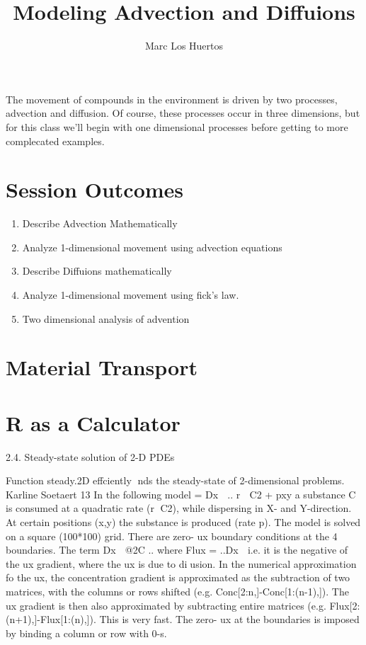 \documentclass{article}
\title{Modeling Advection and Diffuions %
}
\author[Marc Los Huertos]{Marc Los Huertos}
\date{}  %
\begin{document}


\maketitle%

\noindent The movement of compounds in the environment is driven by two processes, advection and diffusion. Of course, these processes occur in three dimensions, but for this class we'll begin with one dimensional processes before getting to more complecated examples.



\section{Session Outcomes}
\begin{enumerate}
	\item Describe Advection Mathematically
	\item Analyze 1-dimensional movement using advection equations
	\item Describe Diffuions mathematically
	\item Analyze 1-dimensional movement using fick's law.
	\item Two dimensional analysis of advention
\end{enumerate}

\section{Material Transport}




\section{R as a Calculator}


2.4. Steady-state solution of 2-D PDEs

Function steady.2D effciently nds the steady-state of 2-dimensional problems.
Karline Soetaert 13
In the following model
= Dx 
.. r  C2 + pxy
a substance C is consumed at a quadratic rate (r C2), while dispersing in X- and Y-direction.
At certain positions (x,y) the substance is produced (rate p).
The model is solved on a square (100*100) grid. There are zero-
ux boundary conditions at
the 4 boundaries.
The term Dx  @2C
..
where
Flux = ..Dx 
i.e. it is the negative of the 
ux gradient, where the 
ux is due to diusion.
In the numerical approximation fo the 
ux, the concentration gradient is approximated as the
subtraction of two matrices, with the columns or rows shifted (e.g. Conc[2:n,]-Conc[1:(n-1),]).
The 
ux gradient is then also approximated by subtracting entire matrices
(e.g. Flux[2:(n+1),]-Flux[1:(n),]). This is very fast. The zero-
ux at the boundaries is
imposed by binding a column or row with 0-s.
\end{document}
